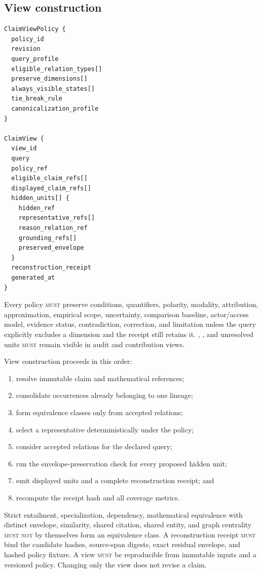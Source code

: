 \subsection{View construction}

\begin{lstlisting}[style=interface]
ClaimViewPolicy {
  policy_id
  revision
  query_profile
  eligible_relation_types[]
  preserve_dimensions[]
  always_visible_states[]
  tie_break_rule
  canonicalization_profile
}

ClaimView {
  view_id
  query
  policy_ref
  eligible_claim_refs[]
  displayed_claim_refs[]
  hidden_units[] {
    hidden_ref
    representative_refs[]
    reason_relation_ref
    grounding_refs[]
    preserved_envelope
  }
  reconstruction_receipt
  generated_at
}
\end{lstlisting}

Every policy \textsc{must} preserve conditions, quantifiers, polarity, modality, attribution, approximation, empirical scope, uncertainty, comparison baseline, actor/access model, evidence status, contradiction, correction, and limitation unless the query explicitly excludes a dimension and the receipt still retains it. , , and unresolved  units \textsc{must} remain visible in audit and contribution views.

View construction proceeds in this order:
\begin{enumerate}
  \item resolve immutable claim and mathematical references;
  \item consolidate occurrences already belonging to one lineage;
  \item form equivalence classes only from accepted  relations;
  \item select a representative deterministically under the policy;
  \item consider accepted  relations for the declared query;
  \item run the envelope-preservation check for every proposed hidden unit;
  \item emit displayed units and a complete reconstruction receipt; and
  \item recompute the receipt hash and all coverage metrics.
\end{enumerate}

Strict entailment, specialization, dependency, mathematical equivalence with distinct envelope, similarity, shared citation, shared entity, and graph centrality \textsc{must not} by themselves form an equivalence class. A reconstruction receipt \textsc{must} bind the candidate hashes, source-span digests, exact residual envelope, and hashed policy fixture. A view \textsc{must} be reproducible from immutable inputs and a versioned policy. Changing only the view does not revise a claim.

